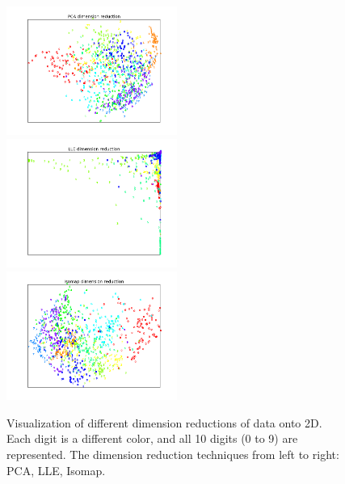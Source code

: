 \documentclass[11pt]{article}
\begin{document}
\begin{figure}[H]
\begin{center}
\includegraphics[width=2.2in]{pca_new.png}
\includegraphics[width=2.2in]{lle_new.png}
\includegraphics[width=2.2in]{isomap_new.png}
\end{center}
\caption{Visualization of different dimension reductions of data onto 2D. Each digit is a different color, and all 10 digits (0 to 9) are represented. The dimension reduction techniques from left to right: PCA, LLE, Isomap.}
\label{reduce_all_digits}
\end{figure}
\end{document}
